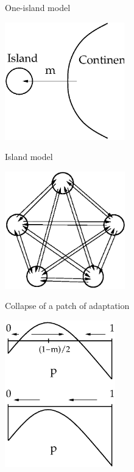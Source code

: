 \documentclass[bluish,slideColor,colorBG,pdf]{prosper}
\begin{document}
\begin{slide}[Replace]{One-island model}

\centerline{\includegraphics[height=2in]{fig4-1.ps}}

\end{slide}

\begin{slide}[Replace]{Island model}

\centerline{\includegraphics[height=2in]{fig4-2.ps}}

\end{slide}

\begin{slide}[Replace]{Collapse of a patch of adaptation}

\centerline{\includegraphics[height=2.5in]{fig4-3a.ps}}

\end{slide}
\end{document}
